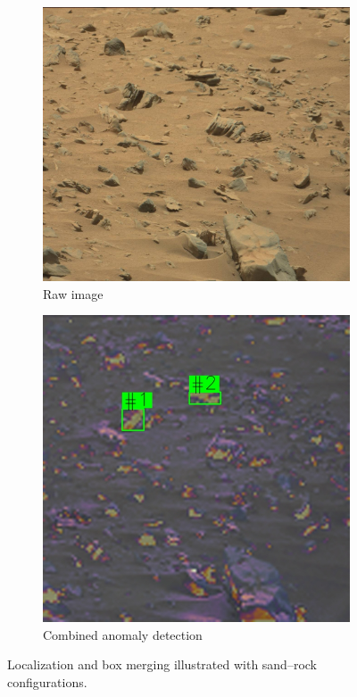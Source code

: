 \documentclass[12pt]{article}
\begin{document}
\begin{figure}[H]
  \centering
  \begin{subfigure}[t]{0.47\textwidth}
    \centering
    \includegraphics[width=\linewidth]{sand_rock.jpg}
    \caption{Raw image}
  \end{subfigure}\hfill
  \begin{subfigure}[t]{0.47\textwidth}
    \centering
    \includegraphics[width=\linewidth]{combined_anomaly_detection.jpg}
    \caption{Combined anomaly detection}
  \end{subfigure}
  \caption{Localization and box merging illustrated with sand–rock configurations.}
  \label{fig:localization-sand-rock}
\end{figure}
\FloatBarrier
\end{document}
